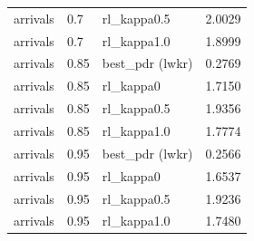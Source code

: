 \begin{table}[htbp]
\begin{tabular}{llll}
arrivals & 0.7 & rl\_kappa0.5 & 2.0029 \\
arrivals & 0.7 & rl\_kappa1.0 & 1.8999 \\
arrivals & 0.85 & best\_pdr (lwkr) & 0.2769 \\
arrivals & 0.85 & rl\_kappa0 & 1.7150 \\
arrivals & 0.85 & rl\_kappa0.5 & 1.9356 \\
arrivals & 0.85 & rl\_kappa1.0 & 1.7774 \\
arrivals & 0.95 & best\_pdr (lwkr) & 0.2566 \\
arrivals & 0.95 & rl\_kappa0 & 1.6537 \\
arrivals & 0.95 & rl\_kappa0.5 & 1.9236 \\
arrivals & 0.95 & rl\_kappa1.0 & 1.7480 \\
\bottomrule
\end{tabular}
\end{table}
